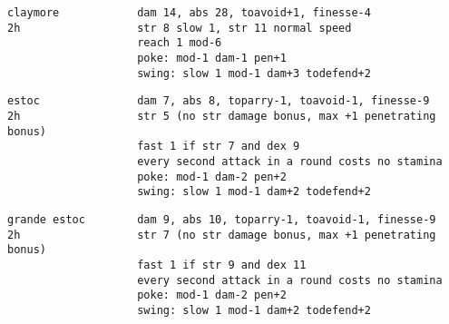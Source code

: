 \begin{samepage}
\begin{verbatim}
claymore            dam 14, abs 28, toavoid+1, finesse-4
2h                  str 8 slow 1, str 11 normal speed
                    reach 1 mod-6
                    poke: mod-1 dam-1 pen+1
                    swing: slow 1 mod-1 dam+3 todefend+2
\end{verbatim} \blocklistgap \begin{verbatim}
estoc               dam 7, abs 8, toparry-1, toavoid-1, finesse-9
2h                  str 5 (no str damage bonus, max +1 penetrating bonus)
                    fast 1 if str 7 and dex 9
                    every second attack in a round costs no stamina
                    poke: mod-1 dam-2 pen+2
                    swing: slow 1 mod-1 dam+2 todefend+2
\end{verbatim} \blocklistgap \begin{verbatim}
grande estoc        dam 9, abs 10, toparry-1, toavoid-1, finesse-9
2h                  str 7 (no str damage bonus, max +1 penetrating bonus)
                    fast 1 if str 9 and dex 11
                    every second attack in a round costs no stamina
                    poke: mod-1 dam-2 pen+2
                    swing: slow 1 mod-1 dam+2 todefend+2
\end{verbatim} \end{samepage} \normalsize \goodbreak

\

